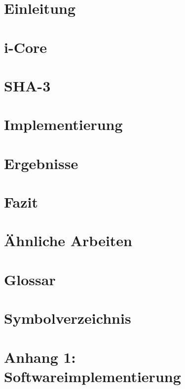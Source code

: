 \chapter{Einleitung}


\chapter{i-Core}


\chapter{SHA-3}


\chapter{Implementierung}

\newpage

\newpage


\newpage


\chapter{Ergebnisse}


\chapter{Fazit}


\chapter{Ähnliche Arbeiten}


\chapter{Glossar}


\chapter{Symbolverzeichnis}


\chapter{Anhang 1: Softwareimplementierung}



